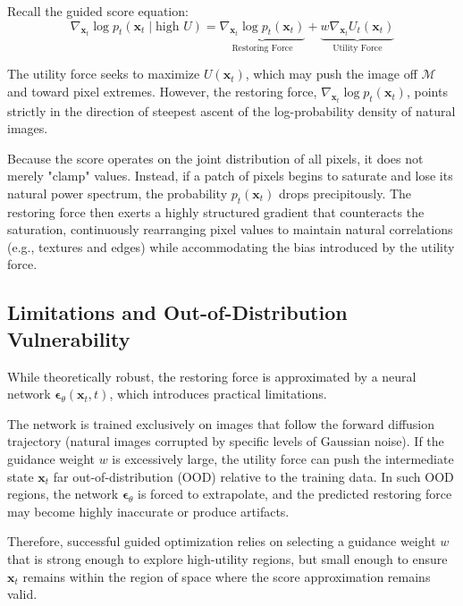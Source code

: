 \documentclass[11pt]{article}
\newcommand{\xb}{\mathbf{x}}
\newcommand{\eb}{\boldsymbol{\epsilon}}
\begin{document}
Recall the guided score equation:
\begin{equation}
    \nabla_{\xb_t} \log p_t(\xb_t \mid \text{high } U) = \underbrace{\nabla_{\xb_t} \log p_t(\xb_t)}_{\text{Restoring Force}} + \underbrace{w \nabla_{\xb_t} U_t(\xb_t)}_{\text{Utility Force}}
\end{equation}

The utility force seeks to maximize $U(\xb_t)$, which may push the image off $\mathcal{M}$ and toward pixel extremes. However, the restoring force, $\nabla_{\xb_t} \log p_t(\xb_t)$, points strictly in the direction of steepest ascent of the log-probability density of natural images.

Because the score operates on the joint distribution of all pixels, it does not merely "clamp" values. Instead, if a patch of pixels begins to saturate and lose its natural power spectrum, the probability $p_t(\xb_t)$ drops precipitously. The restoring force then exerts a highly structured gradient that counteracts the saturation, continuously rearranging pixel values to maintain natural correlations (e.g., textures and edges) while accommodating the bias introduced by the utility force. 

\subsection{Limitations and Out-of-Distribution Vulnerability}

While theoretically robust, the restoring force is approximated by a neural network $\eb_\theta(\xb_t, t)$, which introduces practical limitations. 

The network is trained exclusively on images that follow the forward diffusion trajectory (natural images corrupted by specific levels of Gaussian noise). If the guidance weight $w$ is excessively large, the utility force can push the intermediate state $\xb_t$ far out-of-distribution (OOD) relative to the training data. In such OOD regions, the network $\eb_\theta$ is forced to extrapolate, and the predicted restoring force may become highly inaccurate or produce artifacts. 

Therefore, successful guided optimization relies on selecting a guidance weight $w$ that is strong enough to explore high-utility regions, but small enough to ensure $\xb_t$ remains within the region of space where the score approximation remains valid.



  
\end{document}
